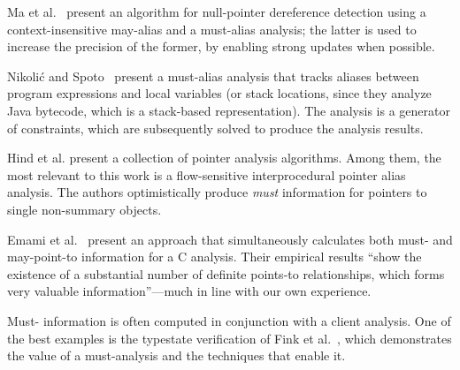 Ma et al.~\cite{DBLP:conf/isola/MaWD08} present an algorithm for
null-pointer dereference detection using a context-insensitive
may-alias and a must-alias analysis; the latter is used to increase
the precision of the former, by enabling strong updates when possible.

Nikoli\'{c} and Spoto~\cite{DBLP:conf/ictac/NikolicS12} present a
must-alias analysis that tracks aliases between program expressions
and local variables (or stack locations, since they analyze Java
bytecode, which is a stack-based representation).  The analysis is a
generator of constraints, which are subsequently solved to produce the
analysis results.

Hind et al. \cite{Hind:1999:IPA:325478.325519} present a collection of pointer
analysis algorithms. Among them, the most relevant to this work is a
flow-sensitive interprocedural pointer alias analysis. The authors
optimistically produce \emph{must} information for pointers to single
non-summary objects.

Emami et al.~\cite{emami-etal-pldi94} present an approach that
simultaneously calculates both must- and may-point-to information for
a C analysis. Their empirical results ``show the existence of a
substantial number of definite points-to relationships, which forms
very valuable information''---much in line with our own
experience.

Must- information is often computed in conjunction with a
client analysis. One of the best examples is the typestate
verification of Fink et al.~\cite{1146254}, which demonstrates the value of
a must-analysis and the techniques that enable it.


